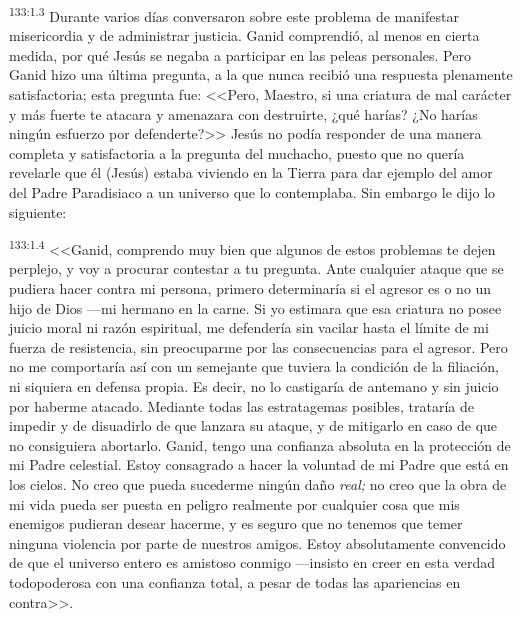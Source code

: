 \par 
\textsuperscript{133:1.3} Durante varios días conversaron sobre este problema de manifestar misericordia y de administrar justicia. Ganid comprendió, al menos en cierta medida, por qué Jesús se negaba a participar en las peleas personales. Pero Ganid hizo una última pregunta, a la que nunca recibió una respuesta plenamente satisfactoria; esta pregunta fue: <<Pero, Maestro, si una criatura de mal carácter y más fuerte te atacara y amenazara con destruirte, ¿qué harías? ¿No harías ningún esfuerzo por defenderte?>> Jesús no podía responder de una manera completa y satisfactoria a la pregunta del muchacho, puesto que no quería revelarle que él (Jesús) estaba viviendo en la Tierra para dar ejemplo del amor del Padre Paradisiaco a un universo que lo contemplaba. Sin embargo le dijo lo siguiente:

\par 
\textsuperscript{133:1.4} <<Ganid, comprendo muy bien que algunos de estos problemas te dejen perplejo, y voy a procurar contestar a tu pregunta. Ante cualquier ataque que se pudiera hacer contra mi persona, primero determinaría si el agresor es o no un hijo de Dios ---mi hermano en la carne. Si yo estimara que esa criatura no posee juicio moral ni razón espiritual, me defendería sin vacilar hasta el límite de mi fuerza de resistencia, sin preocuparme por las consecuencias para el agresor. Pero no me comportaría así con un semejante que tuviera la condición de la filiación, ni siquiera en defensa propia. Es decir, no lo castigaría de antemano y sin juicio por haberme atacado. Mediante todas las estratagemas posibles, trataría de impedir y de disuadirlo de que lanzara su ataque, y de mitigarlo en caso de que no consiguiera abortarlo. Ganid, tengo una confianza absoluta en la protección de mi Padre celestial. Estoy consagrado a hacer la voluntad de mi Padre que está en los cielos. No creo que pueda sucederme ningún daño \textit{real;} no creo que la obra de mi vida pueda ser puesta en peligro realmente por cualquier cosa que mis enemigos pudieran desear hacerme, y es seguro que no tenemos que temer ninguna violencia por parte de nuestros amigos. Estoy absolutamente convencido de que el universo entero es amistoso conmigo ---insisto en creer en esta verdad todopoderosa con una confianza total, a pesar de todas las apariencias en contra>>.

